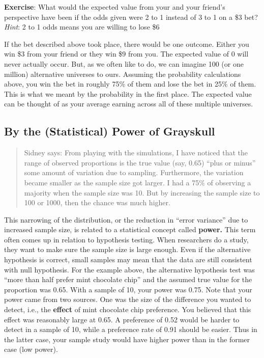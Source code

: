 \documentclass[openany]{book}
\begin{document}
\textbf{Exercise}: What would the expected value from your and your friend's perspective have been if the odds given were 2 to 1 instead of 3 to 1 on a \$3 bet? \emph{Hint}: 2 to 1 odds means you are willing to lose \$6

If the bet described above took place, there would be one outcome. Either you win \$3 from your friend or they win \$9 from you. The expected value of 0 will never actually occur. But, as we often like to do, we can imagine 100 (or one million) alternative universes to ours. Assuming the probability calculations above, you win the bet in roughly 75\% of them and lose the bet in 25\% of them. This is what we meant by the probability in the first place. The expected value can be thought of as your average earning across all of these multiple universes.

\hypertarget{by-the-statistical-power-of-grayskull}{%
\subsection*{By the (Statistical) Power of Grayskull}\label{by-the-statistical-power-of-grayskull}}

\begin{quote}
Sidney says: From playing with the simulations, I have noticed that the range of observed proportions is the true value (say, 0.65) ``plus or minus'' some amount of variation due to sampling. Furthermore, the variation became smaller as the sample size got larger. I had a 75\% of observing a majority when the sample size was 10. But by increasing the sample size to 100 or 1000, then the chance was much higher.
\end{quote}

This narrowing of the distribution, or the reduction in ``error variance'' due to increased sample size, is related to a statistical concept called \textbf{power.} This term often comes up in relation to hypothesis testing. When researchers do a study, they want to make sure the sample size is large enough. Even if the alternative hypothesis is correct, small samples may mean that the data are still consistent with null hypothesis. For the example above, the alternative hypothesis test was ``more than half prefer mint chocolate chip'' and the assumed true value for the proportion was 0.65. With a sample of 10, your power was 0.75. Note that your power came from two sources. One was the size of the difference you wanted to detect, i.e., the \textbf{effect} of mint chocolate chip preference. You believed that this effect was reasonably large at 0.65. A preference of 0.52 would be harder to detect in a sample of 10, while a preference rate of 0.91 should be easier. Thus in the latter case, your sample study would have higher power than in the former case (low power).
\end{document}

